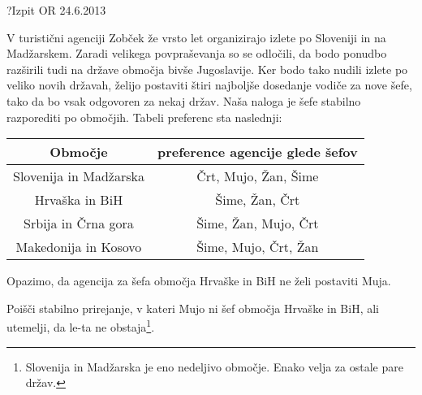 \begin{naloga}{?}{Izpit OR 24.6.2013}
\begin{vprasanje}[zobcek2]
V turistični agenciji Zobček že vrsto let
organizirajo izlete po Sloveniji in na Madžarskem.
Zaradi velikega povpraševanja so se odločili,
da bodo ponudbo razširili tudi na države območja bivše Jugoslavije.
Ker bodo tako nudili izlete po veliko novih državah,
želijo postaviti štiri najboljše dosedanje vodiče za nove šefe,
tako da bo vsak odgovoren za nekaj držav.
Naša naloga je šefe stabilno razporediti po območjih.
Tabeli preferenc sta naslednji:
\begin{center}

\bigskip
\begin{tabular}{c|c}
Območje                & preference agencije glede šefov \\ \hline
Slovenija in Madžarska & Črt, Mujo, Žan, Šime \\
Hrvaška in BiH         & Šime, Žan, Črt \\
Srbija in Črna gora    & Šime, Žan, Mujo, Črt \\
Makedonija in Kosovo   & Šime, Mujo, Črt, Žan
\end{tabular}
\end{center}
Opazimo, da agencija za šefa območja Hrvaške in BiH ne želi postaviti Muja.

Poišči stabilno prirejanje, v kateri Mujo ni šef območja Hrvaške in BiH,
ali utemelji, da le-ta ne obstaja\footnote{
Slovenija in Madžarska je eno nedeljivo območje.
Enako velja za ostale pare držav.
}.
\end{vprasanje}
\begin{odgovor}
\end{odgovor}
\end{naloga}
